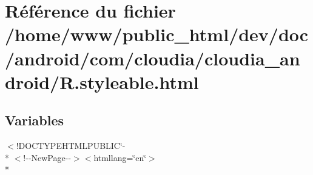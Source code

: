 \hypertarget{_r_8styleable_8html}{\section{Référence du fichier /home/www/public\-\_\-html/dev/doc/android/com/cloudia/cloudia\-\_\-android/\-R.styleable.\-html}
\label{_r_8styleable_8html}
}
\subsection*{Variables}
\begin{DoxyCompactItemize}
\item 
$<$!D\-O\-C\-T\-Y\-P\-E\-H\-T\-M\-L\-P\-U\-B\-L\-I\-C\char`\"{}-\/\\*
$<$!-\/-\/New\-Page-\/-\/$>$$<$htmllang=\char`\"{}en\char`\"{}$>$\\*
$$
\end{DoxyCompactItemize}
